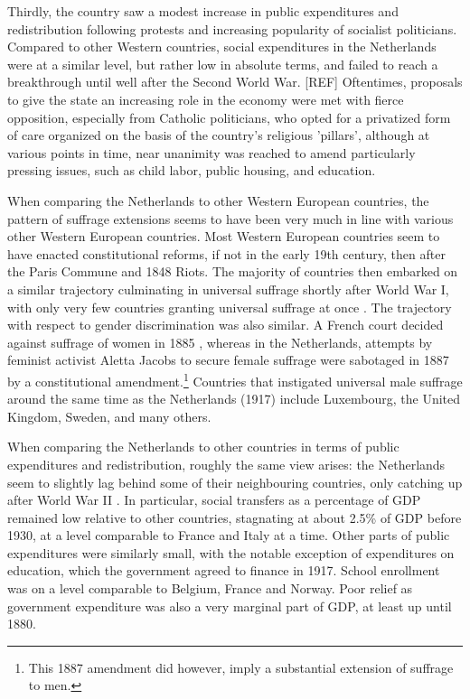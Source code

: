Thirdly, the country saw a modest increase in public expenditures and redistribution following protests and increasing popularity of socialist politicians. Compared to other Western countries, social expenditures in the Netherlands were at a similar level, but rather low in absolute terms, and failed to reach a breakthrough until well after the Second World War. [REF] Oftentimes, proposals to give the state an increasing role in the economy were met with fierce opposition, especially from Catholic politicians, who opted for a privatized form of care organized on the basis of the country's religious 'pillars', although at various points in time, near unanimity was reached to amend particularly pressing issues, such as child labor, public housing, and education. \autocite{van2013eerste}

When comparing the Netherlands to other Western European countries,  the pattern of suffrage extensions seems to have been very much in line with various other Western European countries. Most Western European countries seem to have enacted constitutional reforms, if not in the early 19th century, then after the Paris Commune and 1848 Riots. The majority of countries then embarked on a similar trajectory culminating in universal suffrage shortly after World War I, with only very few countries granting universal suffrage at once \autocite{caramani2017elections}. The trajectory with respect to gender discrimination was also similar. A French court decided against suffrage of women in 1885 \autocite{przeworski2009conquered}, whereas in the Netherlands, attempts by feminist activist Aletta Jacobs to secure female suffrage were sabotaged in 1887 by a constitutional amendment.\footnote{This 1887 amendment did however, imply a substantial extension of suffrage to men.} Countries that instigated universal male suffrage around the same time as the Netherlands (1917) include Luxembourg, the United Kingdom, Sweden, and many others. \autocite{caramani2017elections}

When comparing the Netherlands to other countries in terms of public expenditures and redistribution, roughly the same view arises: the Netherlands seem to slightly lag behind some of their neighbouring countries, only catching up after World War II \autocite{lindert2004growing}. In particular, social transfers as a percentage of GDP remained low relative to other countries, stagnating at about 2.5\% of GDP before 1930, at a level comparable to France and Italy at a time. Other parts of public expenditures were similarly small, with the notable exception of expenditures on education, which the government agreed to finance in 1917. School enrollment was on a level comparable to Belgium, France and Norway. Poor relief as government expenditure was also a very marginal part of GDP, at least up until 1880. \autocite{van2000eenheiddstaat, lindert2004growing}

